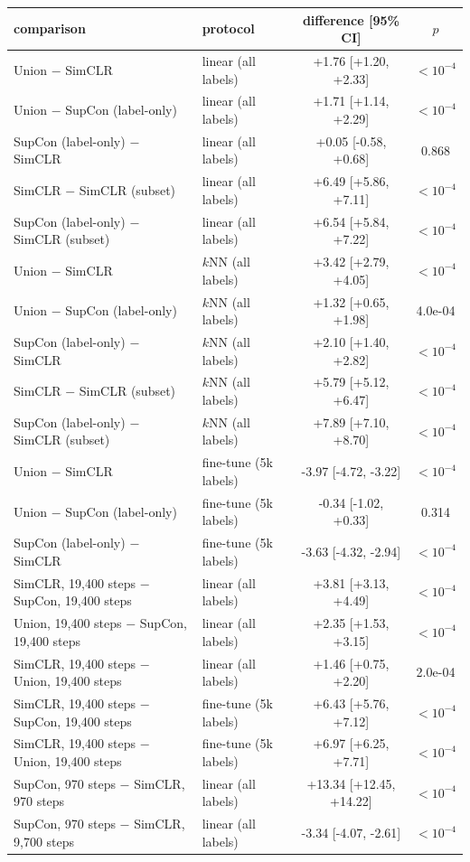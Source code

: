 \begin{tabular}{llcc}
\toprule
comparison & protocol & difference [95\% CI] & $p$ \\
\midrule
Union $-$ SimCLR & linear (all labels) & +1.76 [+1.20, +2.33] & $<10^{-4}$ \\
Union $-$ SupCon (label-only) & linear (all labels) & +1.71 [+1.14, +2.29] & $<10^{-4}$ \\
SupCon (label-only) $-$ SimCLR & linear (all labels) & +0.05 [-0.58, +0.68] & 0.868 \\
SimCLR $-$ SimCLR (subset) & linear (all labels) & +6.49 [+5.86, +7.11] & $<10^{-4}$ \\
SupCon (label-only) $-$ SimCLR (subset) & linear (all labels) & +6.54 [+5.84, +7.22] & $<10^{-4}$ \\
Union $-$ SimCLR & $k$NN (all labels) & +3.42 [+2.79, +4.05] & $<10^{-4}$ \\
Union $-$ SupCon (label-only) & $k$NN (all labels) & +1.32 [+0.65, +1.98] & 4.0e-04 \\
SupCon (label-only) $-$ SimCLR & $k$NN (all labels) & +2.10 [+1.40, +2.82] & $<10^{-4}$ \\
SimCLR $-$ SimCLR (subset) & $k$NN (all labels) & +5.79 [+5.12, +6.47] & $<10^{-4}$ \\
SupCon (label-only) $-$ SimCLR (subset) & $k$NN (all labels) & +7.89 [+7.10, +8.70] & $<10^{-4}$ \\
Union $-$ SimCLR & fine-tune (5k labels) & -3.97 [-4.72, -3.22] & $<10^{-4}$ \\
Union $-$ SupCon (label-only) & fine-tune (5k labels) & -0.34 [-1.02, +0.33] & 0.314 \\
SupCon (label-only) $-$ SimCLR & fine-tune (5k labels) & -3.63 [-4.32, -2.94] & $<10^{-4}$ \\
SimCLR, 19,400 steps $-$ SupCon, 19,400 steps & linear (all labels) & +3.81 [+3.13, +4.49] & $<10^{-4}$ \\
Union, 19,400 steps $-$ SupCon, 19,400 steps & linear (all labels) & +2.35 [+1.53, +3.15] & $<10^{-4}$ \\
SimCLR, 19,400 steps $-$ Union, 19,400 steps & linear (all labels) & +1.46 [+0.75, +2.20] & 2.0e-04 \\
SimCLR, 19,400 steps $-$ SupCon, 19,400 steps & fine-tune (5k labels) & +6.43 [+5.76, +7.12] & $<10^{-4}$ \\
SimCLR, 19,400 steps $-$ Union, 19,400 steps & fine-tune (5k labels) & +6.97 [+6.25, +7.71] & $<10^{-4}$ \\
SupCon, 970 steps $-$ SimCLR, 970 steps & linear (all labels) & +13.34 [+12.45, +14.22] & $<10^{-4}$ \\
SupCon, 970 steps $-$ SimCLR, 9,700 steps & linear (all labels) & -3.34 [-4.07, -2.61] & $<10^{-4}$ \\
\bottomrule
\end{tabular}

